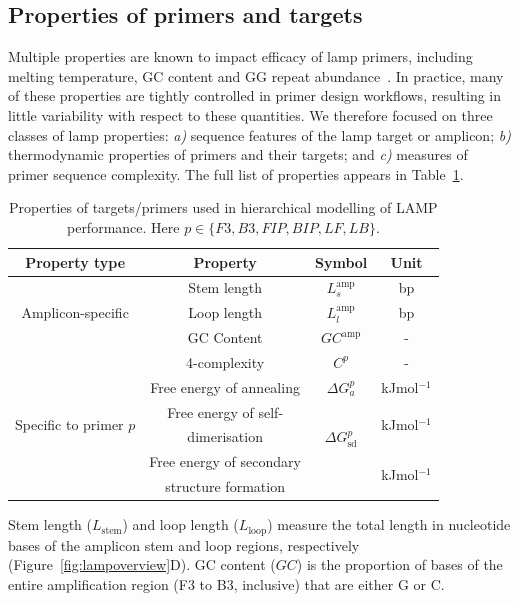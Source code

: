 \documentclass[../thesis.tex]{subfiles}
\begin{document}
\subsection{Properties of primers and targets \label{sec:freeenergy}}
Multiple properties are known to impact efficacy of \gls{lamp} primers, including melting temperature, GC content and GG repeat abundance~\citep{eiken_primerexplorer_2019}. In practice, many of these properties are tightly controlled in primer design workflows, resulting in little variability with respect to these quantities. We therefore focused on three classes of \gls{lamp} properties: \emph{a)} sequence features of the \gls{lamp} target or amplicon; \emph{b)} thermodynamic properties of primers and their targets; and \emph{c)} measures of primer sequence complexity. The full list of properties appears in Table~\ref{tab:properties}. 
\begin{table}[!t] 
\centering
{\begin{tabular}{cccc}
\hline \textbf{Property type} &\textbf{Property} & \textbf{Symbol} &
\textbf{Unit}  \\\hline
\multirow{3}{*}{Amplicon-specific} & Stem length & $L_s^{\text{amp}}$ & bp  \\
&Loop length & $L_l^{\text{amp}}$ & bp  \\
&GC Content & $GC^{\text{amp}}$ & -  \\
\hline
\multirow{6}{*}{Specific to primer $p$} &4-complexity & $C^p$ & -  \\ 
&Free energy of annealing & $\Delta G_a^p$ & kJmol$^{-1}$ \\
&Free energy of self- & \multirow{3}{*}{$\Delta G^p_{\text{sd}}$} & \multirow{2}{*}{kJmol$^{-1}$} \\
&dimerisation   & &  \\
&Free energy of secondary  & \multirow{2}{*}{$\Delta G^p_{\text{ss}}$} & \multirow{2}{*}{kJmol$^{-1}$} \\
&structure formation  & &  \\ 
\hline
\end{tabular}}
\caption{Properties of targets/primers used in hierarchical modelling of LAMP performance. Here $p \in \{F3, B3, FIP, BIP, LF, LB \}$.\label{tab:properties}} 
\end{table}
Stem length ($L_{\text{stem}}$) and loop length ($L_{\text{loop}}$) measure the total length in nucleotide bases of the amplicon stem and loop regions, respectively (Figure~\ref{fig:lampoverview}D). GC content ($GC$) is the proportion of bases of the entire amplification region (F3 to B3, inclusive) that are either G or C.
\end{document}
